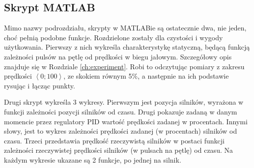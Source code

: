 \subsection*{Skrypt MATLAB}
Mimo nazwy podrozdziału, skrypty w MATLABie są ostatecznie dwa, nie jeden, choć pełnią podobne funkcje. Rozdzielone zostały dla czystości i wygody użytkowania. Pierwszy z nich wykreśla charakterystykę statyczną, będącą funkcją zależności pulsów na pętlę od prędkości w biegu jałowym. Szczegółowy opis znajduje się w Rozdziale \ref{ch:experiment}. Robi to odczytując pomiary z zakresu prędkości $\left<0; 100\right>$, ze skokiem równym 5\%, a następnie na ich podstawie rysując i łącząc punkty.

Drugi skrypt wykreśla 3 wykresy. Pierwszym jest pozycja silników, wyrażona w funkcji zależności pozycji silników od czasu. Drugi pokazuje zadaną w danym momencie przez regulatory PID wartość prędkości zadanej w procentach. Innymi słowy, jest to wykres zależności prędkości zadanej (w procentach) silników od czasu. Trzeci przedstawia prędkość rzeczywistą silników w postaci funkcji zależności rzeczywistej prędkości silników (w pulsach na pętlę) od czasu. Na każdym wykresie ukazane są 2 funkcje, po jednej na silnik.